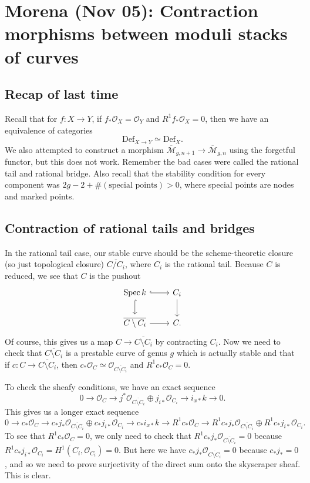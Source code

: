 \documentclass[leqno, openany]{memoir}
\theoremstyle{definition}
\theoremstyle{remark}
\theoremstyle{plain}
\theoremstyle{definition}
\theoremstyle{remark}
\newcommand{\mc}[1]{\mathcal{#1}}
\newcommand{\mr}[1]{\mathrm{#1}}
\newcommand{\ol}[1]{\overline{#1}}
\DeclareMathOperator{\Spec}{Spec}
\begin{document}
\chapter{Morena (Nov 05): Contraction morphisms between moduli stacks of curves}%
\label{cha:morena_nov_05_contraction_morphisms_between_moduli_stacks_of_curves}

\section{Recap of last time}%
\label{sec:recap_of_last_time}

Recall that for $f \colon X \to Y$, if $f_* \mc{O}_X = \mc{O}_Y$ and $R^1 f_* \mc{O}_X = 0$, then we have an equivalence of categories
\[ \mr{Def}_{X \to Y} \simeq \mr{Def}_X. \]
We also attempted to construct a morphism $\ol{\mc{M}}_{g, n+1} \to \ol{\mc{M}}_{g, n}$ using the forgetful functor, but this does not work. Remember the bad cases were called the rational tail and rational bridge. Also recall that the stability condition for every component was $2 g - 2 + \#(\text{special points}) > 0$, where special points are nodes and marked points.

\section{Contraction of rational tails and bridges}%
\label{sec:contraction_of_rational_tails_and_bridges}

In the rational tail case, our stable curve should be the scheme-theoretic closure (so just topological closure) $\ol{C / C_i}$, where $C_i$ is the rational tail. Because $C$ is reduced, we see that $C$ is the pushout
\begin{equation*}
\begin{tikzcd}
    \Spec k \ar[hookrightarrow]{r} \ar[hookrightarrow]{d} & C_i \ar{d} \\
    \ol{C \setminus C_i} \ar{r} & C.
\end{tikzcd}
\end{equation*}
Of course, this gives us a map $C \to \ol{C \setminus C_i}$ by contracting $C_i$.
Now we need to check that $\ol{C \setminus C_i}$ is a prestable curve of genus $g$ which is actually stable and that if $c \colon C \to \ol{C \setminus C_i}$, then $c_* \mc{O}_C \simeq \mc{O}_{\ol{C \setminus C_i}}$ and $R^1 c_* \mc{O}_C = 0$.

To check the sheafy conditions, we have an exact sequence
\[ 0 \to \mc{O}_C \to j^* \mc{O}_{\ol{C \setminus C_i}} \oplus j_{i*} \mc{O}_{C_i} \to i_{x*} k \to 0. \]
This gives us a longer exact sequence
\[ 0 \to c_* \mc{O}_C \to c_* j_* \mc{O}_{\ol{C \setminus C_i}} \oplus c_* j_{i*} \mc{O}_{C_i} \to c_* i_{x*} k \to R^1 c_* \mc{O}_C \to R^1 c_* j_* \mc{O}_{\ol{C \setminus C_i}} \oplus R^1 c_* j_{i*} \mc{O}_{C_i}. \]
To see that $R^1 c_* \mc{O}_C = 0$, we only need to check that $R^1 c_* j_* \mc{O}_{\ol{C \setminus C_i}} = 0$ because $R^1 c_* j_{i*} \mc{O}_{C_i} = H^1(C_i, \mc{O}_{C_i}) = 0$. But here we have $c_* j_* \mc{O}_{\ol{C \setminus C_i}} = 0$ because $c_* j_* = 0$, and so we need to prove surjectivity of the direct sum onto the skyscraper sheaf. This is clear.
\end{document}
